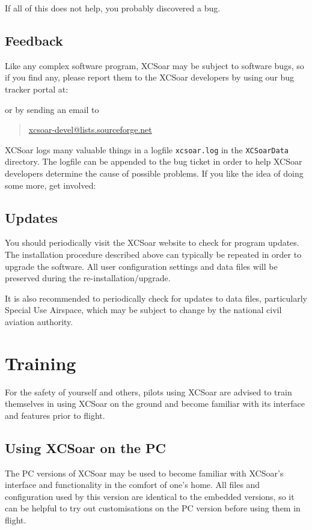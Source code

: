 If all of this does not help, you probably discovered a bug.

\subsection*{Feedback}
Like any complex software program, XCSoar may be subject to software
bugs, so if you find any, please report them to the XCSoar developers
by using our bug tracker portal at: 
\begin{quote}
\end{quote}
or by sending an email to
\begin{quote}
\href{mailto:xcsoar-devel@lists.sourceforge.net}{xcsoar-devel@lists.sourceforge.net}
\end{quote}
XCSoar logs many valuable things in a logfile
\verb|xcsoar.log| in the \texttt{XCSoarData} directory. The logfile can be appended to the bug ticket in order to help XCSoar developers determine the cause of possible problems.
If you like the idea of doing some more, get involved:
\begin{quote}
\end{quote}

\subsection*{Updates}
You should periodically visit the XCSoar website to check for program
updates. The installation procedure described above can typically be
repeated in order to upgrade the software.  All user configuration
settings and data files will be preserved during the
re-installation/upgrade.

It is also recommended to periodically check for updates to data
files, particularly Special Use Airspace, which may be subject to
change by the national civil aviation authority.

\section{Training}
For the safety of yourself and others, pilots using XCSoar are advised to
train themselves in using XCSoar on the ground and become familiar with its
interface and features prior to flight.

\subsection*{Using XCSoar on the PC}
The PC versions of XCSoar may be used to become familiar with XCSoar's
interface and functionality in the comfort of one's home.  All files
and configuration used by this version are identical to the embedded versions,
so it can be helpful to try out customisations on the PC version before using
them in flight.

